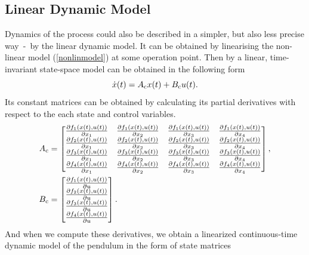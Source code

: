 \subsection{Linear Dynamic Model}
Dynamics of the process could also be described in a simpler, but also less precise way~-~by the linear dynamic model. It can be obtained by linearising the non-linear model (\ref{nonlinmodel}) at some operation point. Then by a linear, time-invariant state-space model can be obtained in the following form
\begin{equation}\dot{x}(t) = A _{\text{c}}x(t) + B _{\text{c}}u(t).\end{equation}
Its constant matrices can be obtained by calculating its partial derivatives with respect to the each state and control variables.
\begin{subequations}\label{linSSmodel:general}
	\begin{align}
	A _{\text{c}} &= \begin{bmatrix}
	\frac{\partial f_1(x(t),u(t))}{\partial x_1}&\frac{\partial f_1(x(t),u(t))}{\partial x_2}&\frac{\partial f_1(x(t),u(t))}{\partial x_3}&\frac{\partial f_1(x(t),u(t))}{\partial x_4}\\
	\frac{\partial f_2(x(t),u(t))}{\partial x_1}&\frac{\partial f_2(x(t),u(t))}{\partial x_2}&\frac{\partial f_2(x(t),u(t))}{\partial x_3}&\frac{\partial f_2(x(t),u(t))}{\partial x_4}\\
	\frac{\partial f_3(x(t),u(t))}{\partial x_1}&\frac{\partial f_3(x(t),u(t))}{\partial x_2}&\frac{\partial f_3(x(t),u(t))}{\partial x_3}&\frac{\partial f_3(x(t),u(t))}{\partial x_4}\\
	\frac{\partial f_4(x(t),u(t))}{\partial x_1}&\frac{\partial f_4(x(t),u(t))}{\partial x_2}&\frac{\partial f_4(x(t),u(t))}{\partial x_3}&\frac{\partial f_4(x(t),u(t))}{\partial x_4}
	\end{bmatrix},\\ 
	B _{\text{c}} &= \begin{bmatrix}
	\frac{\partial f_1(x(t),u(t))}{\partial u}\\\frac{\partial f_2(x(t),u(t))}{\partial u}\\\frac{\partial f_3(x(t),u(t))}{\partial u}\\\frac{\partial f_4(x(t),u(t))}{\partial u}
	\end{bmatrix}.
	\end{align}
\end{subequations}
And when we compute these derivatives, we obtain a linearized continuous-time dynamic model of the pendulum in the form of state matrices
